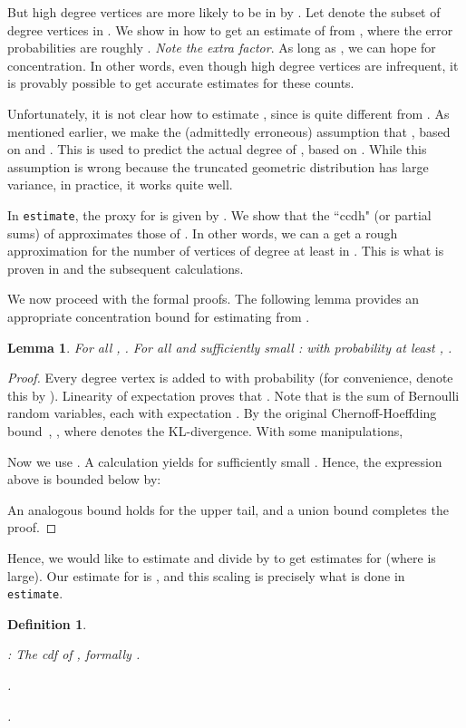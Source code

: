 \documentclass[11pt]{article}
\newtheorem{lemma}[theorem]{Lemma}
\newtheorem{definition}{Definition}
\theoremstyle{definition}
\newcommand{\est}{{\tt estimate}}
\begin{document}
But high degree vertices are more likely to be in  by .
Let  denote the subset of degree  vertices in .
We show in  how to get an estimate of  from ,
where the error probabilities are roughly .
\emph{Note the extra  factor}. As long as , we can
hope for concentration. In other words, even though high degree vertices are infrequent,
it is provably possible to get accurate estimates for these counts.

Unfortunately, it is not clear how to estimate , since 
is quite different from . As mentioned earlier, we
make the (admittedly erroneous) assumption that ,
based on  and . This is used to predict the actual degree
of , based on . While this assumption is wrong because the truncated
geometric distribution has large variance, in practice, it works quite well.

In \est, the proxy for  is given by . We show
that the ``ccdh" (or partial sums) of  approximates those of .
In other words, we can a get a rough approximation for the number of vertices
of degree at least  in . This is what is proven in  and the subsequent calculations.

We now proceed with the formal proofs. The following lemma provides an appropriate concentration bound
for estimating  from .

\begin{lemma} \label{lem:highdeg} For all , . For all
 and sufficiently small : with probability at least ,
.
\end{lemma}

\begin{proof} Every degree  vertex is added to  with probability  (for convenience,
denote this by ).
Linearity of expectation proves that .
Note that  is the sum of Bernoulli random variables, each with expectation .
By the original Chernoff-Hoeffding bound~\cite{Ch52}, ,
where  denotes the KL-divergence. With some manipulations,

Now we use . A calculation yields
 for sufficiently small .
Hence, the expression above is bounded below by:

An analogous bound holds for the upper tail, and a union bound completes the proof.
\end{proof}

Hence, we would like to estimate  and divide by  to get estimates for
 (where  is large). Our estimate for  is , and this
scaling is precisely what is done in \est.

\begin{definition} \label{def:geocdf}
\begin{asparaitem}
    \item : The cdf of , formally .
    \item .
    \item .
\end{asparaitem}
\end{definition}
\end{document}
